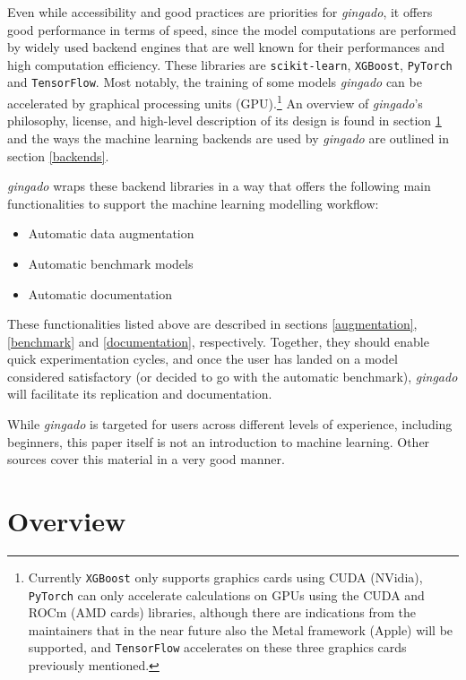 \documentclass{article}
\begin{document}
Even while accessibility and good practices are priorities for \textit{gingado}, it offers good performance in terms of speed, since the model computations are performed by widely used backend engines that are well known for their performances and high computation efficiency. These libraries are \texttt{scikit-learn}, \texttt{XGBoost}, \texttt{PyTorch} and \texttt{TensorFlow}. Most notably, the training of some models \textit{gingado} can be accelerated by graphical processing units (GPU).\footnote{Currently \texttt{XGBoost} only supports graphics cards using CUDA (NVidia), \texttt{PyTorch} can only accelerate calculations on GPUs using the CUDA and ROCm (AMD cards) libraries, although there are indications from the maintainers that in the near future also the Metal framework (Apple) will be supported, and \texttt{TensorFlow} accelerates on these three graphics cards previously mentioned.} An overview of \textit{gingado}'s philosophy, license, and high-level description of its design is found in section \ref{overview} and the ways the machine learning backends are used by \textit{gingado} are outlined in section \ref{backends}.

\textit{gingado} wraps these backend libraries in a way that offers the following main functionalities to support the machine learning modelling workflow:
\begin{itemize}
    \item Automatic data augmentation
    \item Automatic benchmark models
    \item Automatic documentation
\end{itemize}

These functionalities listed above are described in sections \ref{augmentation}, \ref{benchmark} and \ref{documentation}, respectively. Together, they should enable quick experimentation cycles, and once the user has landed on a model considered satisfactory (or decided to go with the automatic benchmark), \textit{gingado} will facilitate its replication and documentation.

While \textit{gingado} is targeted for users across different levels of experience, including beginners, this paper itself is not an introduction to machine learning. Other sources cover this material in a very good manner.

\section{Overview}\label{overview}
\end{document}
